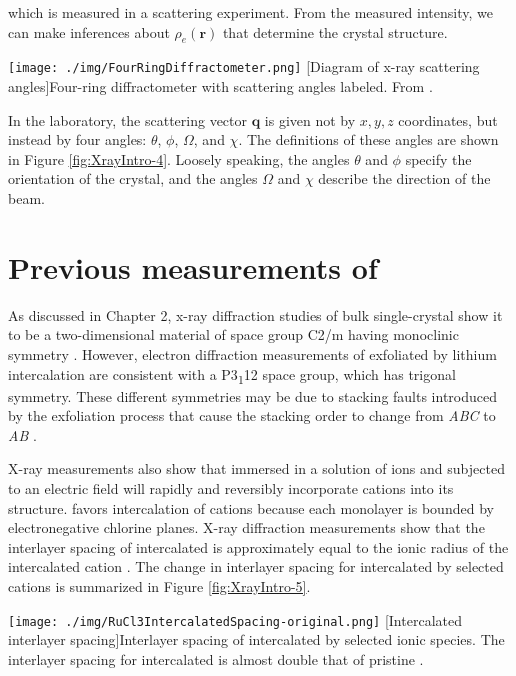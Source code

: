which is measured in a scattering experiment. From the measured intensity, we can make inferences about $\rho_{e}(\mathbf{r})$ that determine the crystal structure.

\begin{centering}
\texttt{[image: ./img/FourRingDiffractometer.png]}
  \captionsetup{width=0.75\textwidth}
  [Diagram of x-ray scattering angles]{Four-ring diffractometer with scattering angles labeled. From \cite{Clark2007}.} 
  \label{fig:XrayIntro-4}
\end{centering}

In the laboratory, the scattering vector $\mathbf{q}$ is given not by  $x,y,z$ coordinates, but instead by four angles: $\theta$, $\phi$, $\Omega$, and $\chi$. The definitions of these angles are shown in Figure \ref{fig:XrayIntro-4}. Loosely speaking, the angles $\theta$ and $\phi$ specify the orientation of the crystal, and the angles $\Omega$ and $\chi$ describe the direction of the beam.

\section{Previous measurements of \rucl}

As discussed in Chapter 2, x-ray diffraction studies of bulk single-crystal \rucl show it to be a two-dimensional material of space group C2/m having monoclinic symmetry \cite{Johnson2015}. However, electron diffraction measurements of \rucl exfoliated by lithium intercalation are consistent with a P3\textsubscript{1}12 space group, which has trigonal symmetry. These different symmetries may be due to stacking faults introduced by the exfoliation process that cause the stacking order to change from \textit{ABC} to \textit{AB} \cite{Gronke2018}.

X-ray measurements also show that \rucl immersed in a solution of ions and subjected to an electric field will rapidly and reversibly incorporate cations into its structure. \rucl favors intercalation of cations because each \rucl monolayer is bounded by electronegative chlorine planes. X-ray diffraction measurements show that the interlayer spacing of intercalated \rucl is approximately equal to the ionic radius of the intercalated cation \cite{Schollhorn1983,Steffen1986}. The change in interlayer spacing for \rucl intercalated by selected cations is summarized in Figure \ref{fig:XrayIntro-5}.

\begin{centering}
\texttt{[image: ./img/RuCl3IntercalatedSpacing-original.png]}
  \captionsetup{width=0.75\textwidth}
  [Intercalated \rucl interlayer spacing]{Interlayer spacing of \rucl intercalated by selected ionic species. The interlayer spacing for intercalated \rucl is almost double that of pristine \ruclnospace .} 
  \label{fig:XrayIntro-5}
\end{centering}

